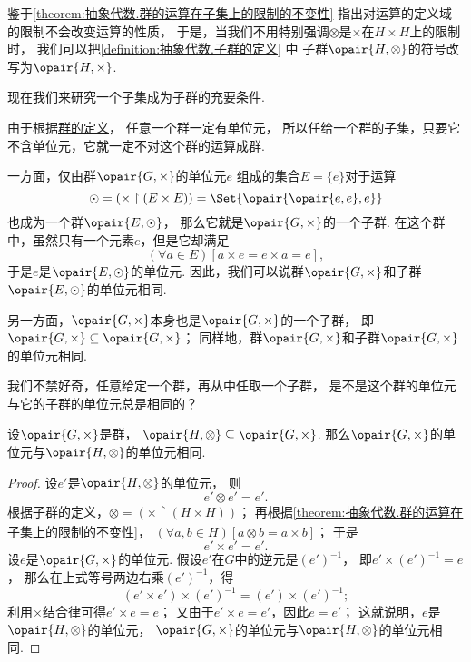 鉴于\cref{theorem:抽象代数.群的运算在子集上的限制的不变性}
指出对运算的定义域的限制不会改变运算的性质，
于是，当我们不用特别强调\(\otimes\)是\(\times\)在\(H\times H\)上的限制时，
我们可以把\cref{definition:抽象代数.子群的定义} 中
子群\(\opair{H,\otimes}\)的符号改写为\(\opair{H,\times}\).

现在我们来研究一个子集成为子群的充要条件.

由于根据\hyperref[definition:抽象代数.群的定义]{群的定义}，
任意一个群一定有单位元，
所以任给一个群的子集，只要它不含单位元，它就一定不对这个群的运算成群.

一方面，仅由群\(\opair{G,\times}\)的单位元\(e\)%
组成的集合\(E=\{e\}\)对于运算\[
	\odot=(\times\upharpoonright(E\times E))
	= \Set{\opair{\opair{e,e},e}}
\]
也成为一个群\(\opair{E,\odot}\)，
那么它就是\(\opair{G,\times}\)的一个子群.
在这个群中，虽然只有一个元素\(e\)，但是它却满足\[
	(\forall a \in E)[a \times e = e \times a = e],
\]
于是\(e\)是\(\opair{E,\odot}\)的单位元.
因此，我们可以说群\(\opair{G,\times}\)和子群\(\opair{E,\odot}\)的单位元相同.

另一方面，\(\opair{G,\times}\)本身也是\(\opair{G,\times}\)的一个子群，
即\(\opair{G,\times}\subseteq\opair{G,\times}\)；
同样地，群\(\opair{G,\times}\)和子群\(\opair{G,\times}\)的单位元相同.

我们不禁好奇，任意给定一个群，再从中任取一个子群，
是不是这个群的单位元与它的子群的单位元总是相同的？

\begin{proposition}\label{theorem:抽象代数.子群.群的单位元与其子群的单位元相同}
设\(\opair{G,\times}\)是群，
\(\opair{H,\otimes}\subseteq\opair{G,\times}\).
那么\(\opair{G,\times}\)的单位元与\(\opair{H,\otimes}\)的单位元相同.
\begin{proof}
设\(e'\)是\(\opair{H,\otimes}\)的单位元，
则\[
	e' \otimes e' = e'.
\]
根据子群的定义，\(\otimes = (\times \upharpoonright(H \times H))\)；
再根据\cref{theorem:抽象代数.群的运算在子集上的限制的不变性}，
\((\forall a,b \in H)[a \otimes b = a \times b]\)；
于是\[
	e' \times e' = e'.
\]
设\(e\)是\(\opair{G,\times}\)的单位元.
假设\(e'\)在\(G\)中的逆元是\((e')^{-1}\)，
即\(e' \times (e')^{-1} = e\)，
那么在上式等号两边右乘\((e')^{-1}\)，得\[
	(e' \times e') \times (e')^{-1} = (e') \times (e')^{-1};
\]
利用\(\times\)结合律可得\(e' \times e = e\)；
又由于\(e' \times e = e'\)，因此\(e = e'\)；
这就说明，\(e\)是\(\opair{H,\otimes}\)的单位元，
\(\opair{G,\times}\)的单位元与\(\opair{H,\otimes}\)的单位元相同.
\end{proof}
\end{proposition}

